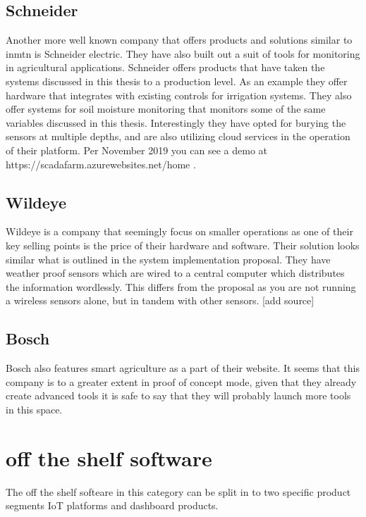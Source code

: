 \documentclass[]{uiophd}
\begin{document}
\subsection{Schneider}
Another more well known company that offers products and solutions similar to inmtn is Schneider electric. They have also built out a suit of tools for monitoring in agricultural applications. Schneider offers products that have taken the systems discussed in this thesis to a production level. As an example they offer hardware that integrates with existing controls for irrigation systems. They also offer systems for soil moisture monitoring that monitors some of the same variables discussed in this thesis. Interestingly they have opted for burying the sensors at multiple depths, and are also utilizing cloud services in the operation of their platform. Per November 2019 you can see a demo at https://scadafarm.azurewebsites.net/home . 

\subsection{Wildeye}
Wildeye is a company that seemingly focus on smaller operations as one of their key selling points is the price of their hardware and software. Their solution looks similar what is outlined in the system implementation proposal. They have weather proof sensors which are wired to a central computer which distributes the information wordlessly. This differs from the proposal as you are not running a wireless sensors alone, but in tandem with other sensors. [add source]

\subsection{Bosch}
Bosch also features smart agriculture as a part of their website. It seems that this company is to a greater extent in proof of concept mode, given that they already create advanced tools it is safe to say that they will probably launch more tools in this space.


\section{off the shelf software}
The off the shelf softeare in this category can be split in to two specific product segments IoT platforms and dashboard products.
\end{document}

